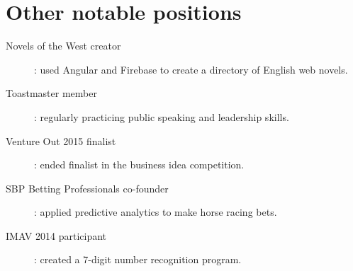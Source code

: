 \documentclass[10pt]{CurriculumVitae}
\begin{document}
  \section{Other notable positions}
    \begin{description}
      \item[Novels of the West creator]: used Angular and Firebase to create a directory of English web novels.
      \item[Toastmaster member]: regularly practicing public speaking and leadership skills.
      \item[Venture Out 2015 finalist]: ended finalist in the business idea competition.
      \item[SBP Betting Professionals co-founder]: applied predictive analytics to make horse racing bets.
      \item[IMAV 2014 participant]:  created a 7-digit number recognition program.
    \end{description}
\end{document}
